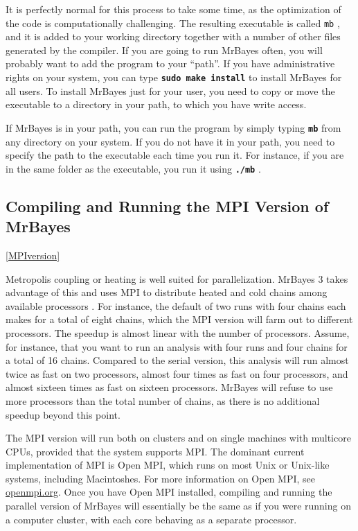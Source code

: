 \documentclass[12pt]{book}
\newcommand{\ttt}[1]{\texttt{#1} }
\newcommand{\tb}[1]{\texttt{\textbf{#1}} }
\begin{document}
It is perfectly normal for this process to take some time, as the optimization of the code is computationally
challenging. The resulting executable is called \ttt{mb}, and it is added to your working directory together with
a number of other files generated by the compiler.
If you are going to run MrBayes often, you will probably want to add the program to your ``path''.
If you have administrative rights on your system, you can type \tb{sudo make install}
to install MrBayes for all users. To install MrBayes just for your user, you need to copy or move the
executable to a directory in your path, to which you have write access.

If MrBayes is in your path, you can run the program by simply typing \tb{mb} from any directory on
your system. If you do not have it in your path, you need to
specify the path to the executable each time you run it. For instance, if you are in the same folder
as the executable, you run it using \tb{./mb}.

\subsection{Compiling and Running the MPI Version of MrBayes}
\ref{MPIversion}

Metropolis coupling or heating is well suited for parallelization. MrBayes 3 takes advantage of this and 
uses MPI to distribute heated and cold 
chains among available processors \citep{altekar04}. For instance, the default of two runs with four chains
each makes for a total of eight chains, which the MPI version will farm out to different processors. The speedup
is almost linear with the number of processors. Assume, for instance, that you want to run an analysis with four
runs and four chains for a total of 16 chains. Compared to the serial version, this analysis will run almost twice
as fast on two processors, almost four times as fast on four processors, and almost sixteen times as fast on
sixteen processors. MrBayes will refuse to use more processors than the total number of chains, as there is
no additional speedup beyond this point.

The MPI version will run both on clusters and on single machines with multicore CPUs, provided that the system
supports MPI. The dominant current implementation of MPI is Open MPI, which runs on most Unix or Unix-like systems,
including Macintoshes. For more information on Open MPI, see \url{openmpi.org}. Once you have Open MPI
installed, compiling and running the parallel version of MrBayes will essentially be the same as if you were
running on a computer cluster, with each core behaving as a separate processor.
\end{document}
